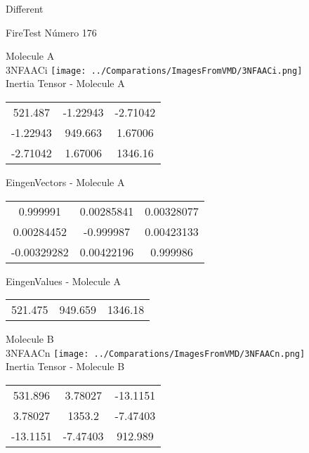 \begin{center}
\vtab
\vtab
\textcolor{NavyBlue}{\Large Different}
\end{center}

 \newpage

\vtab[-2cm]
\begin{center}
{\large FireTest \tab Número 176}
\end{center}
\begin{multicols}{2}
\begin{center}

Molecule A \\ 
3NFAACi
\texttt{[image: ../Comparations/ImagesFromVMD/3NFAACi.png]}
\\
Inertia Tensor - Molecule A \\
\vtab

\begin{tabular}{|c c c|}
521.487	 & 	-1.22943	 & 	-2.71042	 \\
-1.22943	 & 	949.663	 & 	1.67006	 \\
-2.71042	 & 	1.67006	 & 	1346.16
\end{tabular}

\vtab
 EingenVectors - Molecule A     \\
\vtab
\begin{tabular}{|c c c|}
0.999991	 & 	0.00285841	 & 	0.00328077	 \\
0.00284452	 & 	-0.999987	 & 	0.00423133	 \\
-0.00329282	 & 	0.00422196	 & 	0.999986
\end{tabular}

\vtab
 EingenValues - Molecule A     \\
\vtab
\begin{tabular}{|c c c|}
521.475	 & 	949.659	 & 	1346.18	 \\
\end{tabular}
\columnbreak

Molecule B \\ 
3NFAACn
\texttt{[image: ../Comparations/ImagesFromVMD/3NFAACn.png]}
\\
Inertia Tensor - Molecule B \\
\vtab

\begin{tabular}{|c c c|}
531.896	 & 	3.78027	 & 	-13.1151	 \\
3.78027	 & 	1353.2	 & 	-7.47403	 \\
-13.1151	 & 	-7.47403	 & 	912.989
\end{tabular}


\end{center}
\end{multicols}

